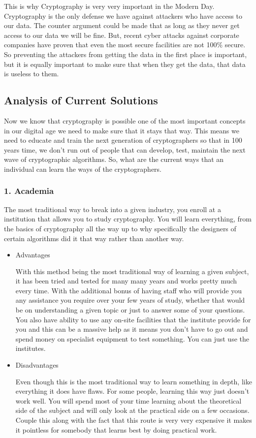This is why Cryptography is very very important in the Modern Day. Cryptography is the only defense we have against attackers who have access to our data. The counter argument could be made that as long as they never get access to our data we will be fine. But, recent cyber attacks against corporate companies have proven that even the most secure facilities are not 100\% secure. So preventing the attackers from getting the data in the first place is important, but it is equally important to make sure that when they get the data, that data is useless to them.  

\subsection{Analysis of Current Solutions}

Now we know that cryptography is possible one of the most important concepts in our digital age we need to make sure that it stays that way. This means we need to educate and train the next generation of cryptographers so that in 100 years time, we don't run out of people that can develop, test, maintain the next wave of cryptographic algorithms. So, what are the current ways that an individual can learn the ways of the cryptographers.

\subsubsection{1. Academia}

The most traditional way to break into a given industry, you enroll at a institution that allows you to study cryptography. You will learn everything, from the basics of cryptography all the way up to why specifically the designers of certain algorithms did it that way rather than another way.

\begin{itemize}
\item{Advantages

With this method being the most traditional way of learning a given subject, it has been tried and tested for many many years and works pretty much every time. With the additional bonus of having staff who will provide you any assistance you require over your few years of study, whether that would be on understanding a given topic or just to answer some of your questions. You also have ability to use any on-site facilities that the institute provide for you and this can be a massive help as it means you don't have to go out and spend money on specialist equipment to test something. You can just use the institutes. 
}

\item{Disadvantages

Even though this is the most traditional way to learn something in depth, like everything it does have flaws. For some people, learning this way just doesn't work well. You will spend most of your time learning about the theoretical side of the subject and will only look at the practical side on a few occasions. Couple this along with the fact that this route is very very expensive it makes it pointless for somebody that learns best by doing practical work. 
}
\end{itemize}


